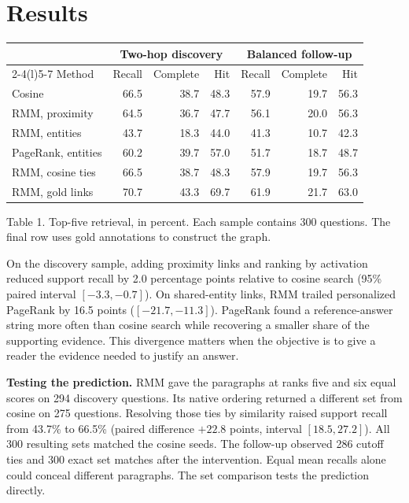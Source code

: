 \documentclass[11pt,a4paper]{article}
\begin{document}
\newpage
\section{Results}
\begin{center}
\begin{tabular}{@{}lrrr@{\hspace{12pt}}rrr@{}}
\toprule
& \multicolumn{3}{c}{Two-hop discovery} & \multicolumn{3}{c}{Balanced follow-up}\\
\cmidrule(lr){2-4}\cmidrule(l){5-7}
Method & Recall & Complete & Hit & Recall & Complete & Hit\\
\midrule
Cosine & 66.5 & 38.7 & 48.3 & 57.9 & 19.7 & 56.3 \\
RMM, proximity & 64.5 & 36.7 & 47.7 & 56.1 & 20.0 & 56.3 \\
RMM, entities & 43.7 & 18.3 & 44.0 & 41.3 & 10.7 & 42.3 \\
PageRank, entities & 60.2 & 39.7 & 57.0 & 51.7 & 18.7 & 48.7 \\
\midrule
RMM, cosine ties & 66.5 & 38.7 & 48.3 & 57.9 & 19.7 & 56.3 \\
\midrule
RMM, gold links & 70.7 & 43.3 & 69.7 & 61.9 & 21.7 & 63.0 \\
\bottomrule
\end{tabular}
\par{\small Table 1. Top-five retrieval, in percent. Each sample contains 300 questions. The final row uses gold annotations to construct the graph.}
\end{center}
On the discovery sample, adding proximity links and ranking by activation reduced support recall by 2.0 percentage points relative to cosine search (95\% paired interval $[-3.3,-0.7]$). On shared-entity links, RMM trailed personalized PageRank by 16.5 points ($[-21.7,-11.3]$). PageRank found a reference-answer string more often than cosine search while recovering a smaller share of the supporting evidence. This divergence matters when the objective is to give a reader the evidence needed to justify an answer.

\textbf{Testing the prediction.} RMM gave the paragraphs at ranks five and six equal scores on 294 discovery questions. Its native ordering returned a different set from cosine on 275 questions. Resolving those ties by similarity raised support recall from 43.7\% to 66.5\% (paired difference $+22.8$ points, interval $[18.5,27.2]$). All 300 resulting sets matched the cosine seeds. The follow-up observed 286 cutoff ties and 300 exact set matches after the intervention. Equal mean recalls alone could conceal different paragraphs. The set comparison tests the prediction directly.
\end{document}
